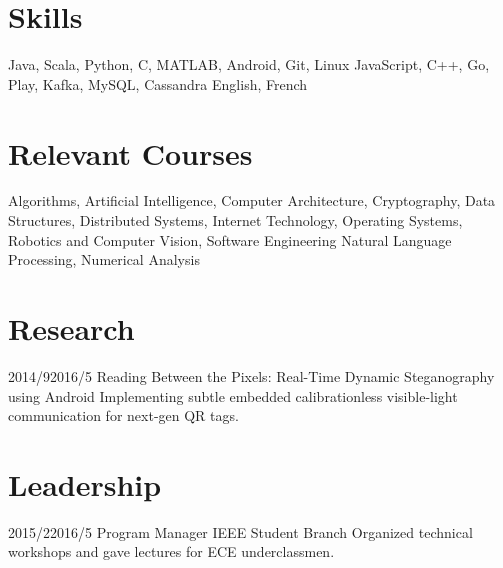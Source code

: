 \documentclass[11pt,letterpaper]{moderncv}
\begin{document}
\section{Skills}
       {Java, Scala, Python, C, MATLAB, Android, Git, Linux}
       {JavaScript, C++, Go, Play, Kafka, MySQL, Cassandra}
       {English, French}

\section{Relevant Courses}
       {Algorithms, Artificial Intelligence, Computer Architecture, Cryptography, Data Structures, Distributed Systems, Internet Technology, Operating Systems, Robotics and Computer Vision, Software Engineering}
       {Natural Language Processing, Numerical Analysis}

\section{Research}
    \tlcventry
        {2014/9}{2016/5}
		{Reading Between the Pixels: Real-Time Dynamic Steganography using Android}
        {}
        {}
        {}
        {Implementing subtle embedded calibrationless visible-light communication for next-gen QR tags.}


\section{Leadership}
	\tlcventry
        {2015/2}{2016/5}
        {Program Manager}
        {}
        {IEEE Student Branch}
        {}
        {Organized technical workshops and gave lectures for ECE underclassmen.}
\end{document}
